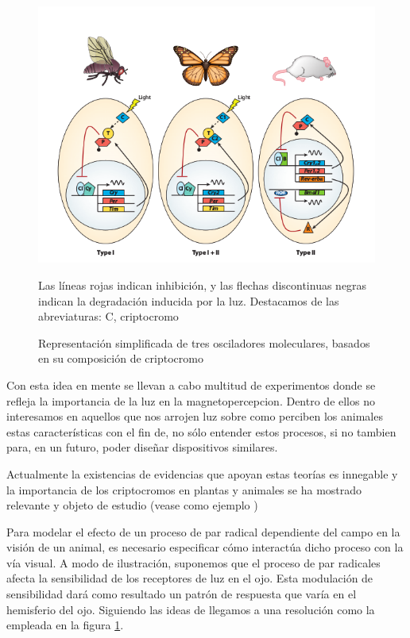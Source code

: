 \documentclass[1p]{elsarticle}
\begin{document}
\begin{figure}
	
	\includegraphics[width=1\textwidth]{diferentes_animales_cripto}
	\caption{Representación simplificada de tres osciladores moleculares, basados en su composición de criptocromo}
	\footnotesize
	Las líneas rojas indican inhibición, y las flechas discontinuas negras indican la degradación inducida por la luz. Destacamos de las abreviaturas: C, criptocromo
	\label{visual}
\end{figure}




Con esta idea en mente se llevan a cabo multitud de experimentos donde se refleja la importancia de la luz en la magnetopercepcion. Dentro de ellos no interesamos en aquellos que nos arrojen luz sobre como perciben los animales estas características con el fin de, no sólo entender estos procesos, si no tambien para, en un futuro, poder diseñar dispositivos similares. 

Actualmente la existencias de evidencias que apoyan estas teorías es innegable y la importancia de los criptocromos en plantas y animales se ha mostrado relevante y objeto de estudio (vease como ejemplo \cite{cromogeneral})

Para modelar el efecto de un proceso de par radical dependiente del campo en la visión de un animal, es necesario especificar cómo interactúa dicho proceso con la vía visual. A modo de ilustración, suponemos que el proceso de par radicales afecta la sensibilidad de los receptores de luz en el ojo. Esta modulación de sensibilidad dará como resultado un patrón de respuesta que varía en el hemisferio del ojo. Siguiendo las ideas de \cite{visualmagne} llegamos a una resolución como la empleada en la figura \ref{visual}.
\end{document}
